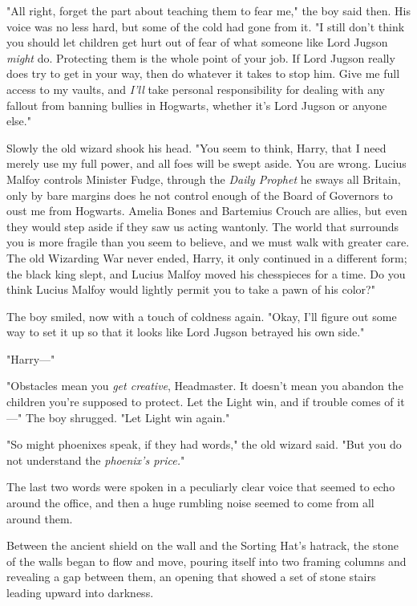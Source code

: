 "All right, forget the part about teaching them to fear me," the boy said then. 
His voice was no less hard, but some of the cold had gone from it. "I still 
don't think you should let children get hurt out of fear of what someone like 
Lord Jugson \emph{might} do. Protecting them is the whole point of your job. If 
Lord Jugson really does try to get in your way, then do whatever it takes to 
stop him. Give me full access to my vaults, and \emph{I'll} take personal 
responsibility for dealing with any fallout from banning bullies in Hogwarts, 
whether it's Lord Jugson or anyone else."

Slowly the old wizard shook his head. "You seem to think, Harry, that I need 
merely use my full power, and all foes will be swept aside. You are wrong. 
Lucius Malfoy controls Minister Fudge, through the \emph{Daily Prophet} he 
sways all Britain, only by bare margins does he not control enough of the Board 
of Governors to oust me from Hogwarts. Amelia Bones and Bartemius Crouch are 
allies, but even they would step aside if they saw us acting wantonly. The 
world that surrounds you is more fragile than you seem to believe, and we must 
walk with greater care. The old Wizarding War never ended, Harry, it only 
continued in a different form; the black king slept, and Lucius Malfoy moved 
his chesspieces for a time. Do you think Lucius Malfoy would lightly permit you 
to take a pawn of his color?"

The boy smiled, now with a touch of coldness again. "Okay, I'll figure out some 
way to set it up so that it looks like Lord Jugson betrayed his own side."

"Harry---"

"Obstacles mean you \emph{get creative}, Headmaster. It doesn't mean you 
abandon the children you're supposed to protect. Let the Light win, and if 
trouble comes of it---" The boy shrugged. "Let Light win again."

"So might phoenixes speak, if they had words," the old wizard said. "But you do 
not understand the \emph{phoenix's price.}"

The last two words were spoken in a peculiarly clear voice that seemed to echo 
around the office, and then a huge rumbling noise seemed to come from all 
around them.

Between the ancient shield on the wall and the Sorting Hat's hatrack, the stone 
of the walls began to flow and move, pouring itself into two framing columns 
and revealing a gap between them, an opening that showed a set of stone stairs 
leading upward into darkness.

